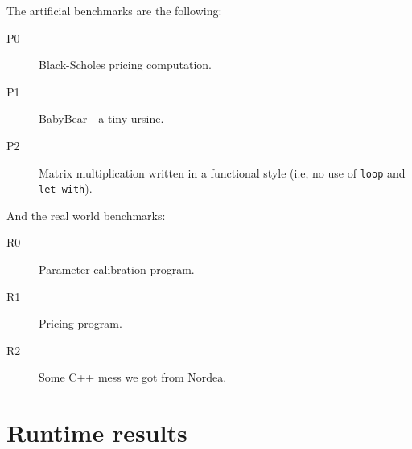The artificial benchmarks are the following:

\begin{description}
\item[P0] Black-Scholes\cite{black1973pricing} pricing computation.

\item[P1] BabyBear - a tiny ursine.

\item[P2] Matrix multiplication written in a functional style (i.e, no
  use of \texttt{loop} and \texttt{let-with}).
\end{description}

And the real world benchmarks:

\begin{description}
\item[R0] Parameter calibration program.

\item[R1] Pricing program.

\item[R2] Some C++ mess we got from Nordea.
\end{description}

\section{Runtime results}
\label{sec:runtime-results}

